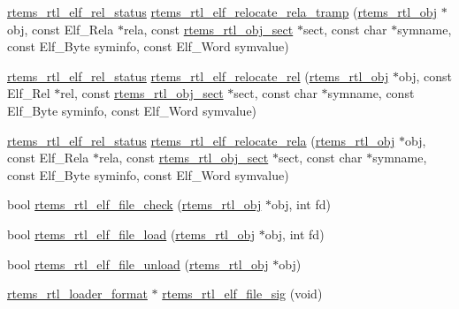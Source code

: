 \begin{DoxyCompactItemize}
\mbox{\hyperlink{rtl-elf_8h_a97d7ca039fc1123f4ca0c7b43d4a811f}{rtems\+\_\+rtl\+\_\+elf\+\_\+rel\+\_\+status}} \mbox{\hyperlink{rtl-elf_8h_a7511cfcc3074932e9a9ad203f206170f}{rtems\+\_\+rtl\+\_\+elf\+\_\+relocate\+\_\+rela\+\_\+tramp}} (\mbox{\hyperlink{structrtems__rtl__obj}{rtems\+\_\+rtl\+\_\+obj}} $\ast$obj, const Elf\+\_\+\+Rela $\ast$rela, const \mbox{\hyperlink{structrtems__rtl__obj__sect}{rtems\+\_\+rtl\+\_\+obj\+\_\+sect}} $\ast$sect, const char $\ast$symname, const Elf\+\_\+\+Byte syminfo, const Elf\+\_\+\+Word symvalue)
\item 
\mbox{\hyperlink{rtl-elf_8h_a97d7ca039fc1123f4ca0c7b43d4a811f}{rtems\+\_\+rtl\+\_\+elf\+\_\+rel\+\_\+status}} \mbox{\hyperlink{rtl-elf_8h_ad554c1fb3e8cc0d159424d936b9bfeea}{rtems\+\_\+rtl\+\_\+elf\+\_\+relocate\+\_\+rel}} (\mbox{\hyperlink{structrtems__rtl__obj}{rtems\+\_\+rtl\+\_\+obj}} $\ast$obj, const Elf\+\_\+\+Rel $\ast$rel, const \mbox{\hyperlink{structrtems__rtl__obj__sect}{rtems\+\_\+rtl\+\_\+obj\+\_\+sect}} $\ast$sect, const char $\ast$symname, const Elf\+\_\+\+Byte syminfo, const Elf\+\_\+\+Word symvalue)
\item 
\mbox{\hyperlink{rtl-elf_8h_a97d7ca039fc1123f4ca0c7b43d4a811f}{rtems\+\_\+rtl\+\_\+elf\+\_\+rel\+\_\+status}} \mbox{\hyperlink{rtl-elf_8h_a7b4892f6735cf0254b2646c50a567fca}{rtems\+\_\+rtl\+\_\+elf\+\_\+relocate\+\_\+rela}} (\mbox{\hyperlink{structrtems__rtl__obj}{rtems\+\_\+rtl\+\_\+obj}} $\ast$obj, const Elf\+\_\+\+Rela $\ast$rela, const \mbox{\hyperlink{structrtems__rtl__obj__sect}{rtems\+\_\+rtl\+\_\+obj\+\_\+sect}} $\ast$sect, const char $\ast$symname, const Elf\+\_\+\+Byte syminfo, const Elf\+\_\+\+Word symvalue)
\item 
bool \mbox{\hyperlink{rtl-elf_8h_a83c2600373c123a070d3762fbb90d367}{rtems\+\_\+rtl\+\_\+elf\+\_\+file\+\_\+check}} (\mbox{\hyperlink{structrtems__rtl__obj}{rtems\+\_\+rtl\+\_\+obj}} $\ast$obj, int fd)
\item 
bool \mbox{\hyperlink{rtl-elf_8h_a6432bdb0006ee34a7b89b3f3088aa5b5}{rtems\+\_\+rtl\+\_\+elf\+\_\+file\+\_\+load}} (\mbox{\hyperlink{structrtems__rtl__obj}{rtems\+\_\+rtl\+\_\+obj}} $\ast$obj, int fd)
\item 
bool \mbox{\hyperlink{rtl-elf_8h_a11980d1727cffdcc360b8f2d02e836df}{rtems\+\_\+rtl\+\_\+elf\+\_\+file\+\_\+unload}} (\mbox{\hyperlink{structrtems__rtl__obj}{rtems\+\_\+rtl\+\_\+obj}} $\ast$obj)
\item 
\mbox{\hyperlink{structrtems__rtl__loader__format}{rtems\+\_\+rtl\+\_\+loader\+\_\+format}} $\ast$ \mbox{\hyperlink{rtl-elf_8h_a89a86f305b09923b92f18b72a5478427}{rtems\+\_\+rtl\+\_\+elf\+\_\+file\+\_\+sig}} (void)
\end{DoxyCompactItemize}


